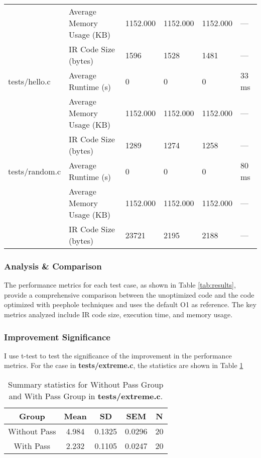 \documentclass[conference]{IEEEtran}
\begin{document}
\begin{table*}[htbp]
\begin{tabular}{|l|l|l|l|l|l|}
		                   & Average Memory Usage (KB) & 1152.000              & 1152.000           & 1152.000          & ---                \\
		                   & IR Code Size (bytes)      & 1596                  & 1528               & 1481              & ---                \\ \hline
		tests/hello.c      & Average Runtime (s)       & 0                     & 0                  & 0                 & 33 ms              \\
		                   & Average Memory Usage (KB) & 1152.000              & 1152.000           & 1152.000          & ---                \\
		                   & IR Code Size (bytes)      & 1289                  & 1274               & 1258              & ---                \\ \hline
		tests/random.c     & Average Runtime (s)       & 0                     & 0                  & 0                 & 80 ms              \\
		                   & Average Memory Usage (KB) & 1152.000              & 1152.000           & 1152.000          & ---                \\
		                   & IR Code Size (bytes)      & 23721                 & 2195               & 2188              & ---                \\
		\hline
	\end{tabular}
	\label{tab:results}
\end{table*}

\subsubsection{Analysis \& Comparison}
The performance metrics for each test case, as shown in Table \ref{tab:results}, provide a comprehensive comparison between the unoptimized code and the code optimized with peephole techniques and uses the default O1 as reference. The key metrics analyzed include IR code size, execution time, and memory usage.

\subsubsection{Improvement Significance}
I use t-test to test the significance of the improvement in the performance metrics. For the case in \textbf{tests/extreme.c}, the statistics are shown in Table \ref{tab:ttest}
\begin{table}[htbp]
	\centering
	\caption{Summary statistics for Without Pass Group and With Pass Group in \textbf{tests/extreme.c}.}
	\begin{tabular}{|c|c|c|c|c|}
		\hline
		\textbf{Group} & \textbf{Mean} & \textbf{SD} & \textbf{SEM} & \textbf{N} \\ \hline
		Without Pass   & 4.984         & 0.1325      & 0.0296       & 20         \\ \hline
		With Pass      & 2.232         & 0.1105      & 0.0247       & 20         \\ \hline
	\end{tabular}
	\label{tab:ttest}
\end{table}
\end{document}
